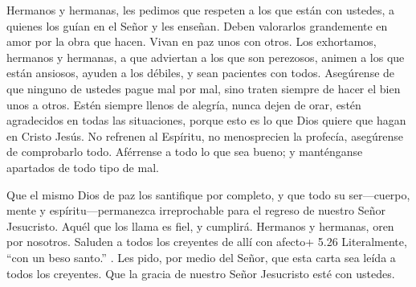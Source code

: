  Hermanos y hermanas, les pedimos que respeten a los que
están con ustedes, a quienes los guían en el Señor y les enseñan.
 Deben valorarlos grandemente en amor por la obra que
hacen. Vivan en paz unos con otros.  Los exhortamos,
hermanos y hermanas, a que adviertan a los que son perezosos, animen a
los que están ansiosos, ayuden a los débiles, y sean pacientes con
todos.  Asegúrense de que ninguno de ustedes pague mal por
mal, sino traten siempre de hacer el bien unos a otros. 
Estén siempre llenos de alegría,  nunca dejen de orar,
 estén agradecidos en todas las situaciones, porque esto es
lo que Dios quiere que hagan en Cristo Jesús.  No refrenen
al Espíritu,  no menosprecien la profecía, 
asegúrense de comprobarlo todo. Aférrense a todo lo que sea bueno;
 y manténganse apartados de todo tipo de mal.

 Que el mismo Dios de paz los santifique por completo, y
que todo su ser---cuerpo, mente y espíritu---permanezca irreprochable
para el regreso de nuestro Señor Jesucristo.  Aquél que los
llama es fiel, y cumplirá.  Hermanos y hermanas, oren por
nosotros.  Saluden a todos los creyentes de allí con
afecto+ 5.26 Literalmente, ``con un beso santo.'' .  Les
pido, por medio del Señor, que esta carta sea leída a todos los
creyentes.  Que la gracia de nuestro Señor Jesucristo esté
con ustedes.
